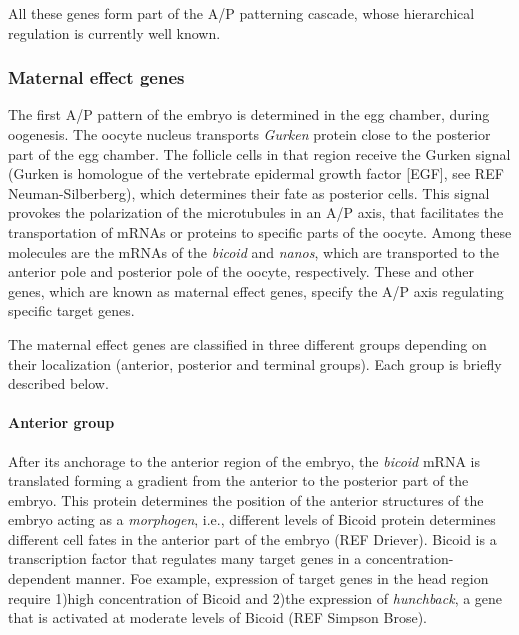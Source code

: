 All these genes form part of the A/P patterning cascade, whose hierarchical regulation is currently well known.

\subsubsection{Maternal effect genes}
The first A/P pattern of the embryo is determined in the egg chamber, during oogenesis.
The oocyte nucleus transports \textit{Gurken} protein close to the posterior part of the egg chamber. 
The follicle cells in that region receive the Gurken signal (Gurken is homologue of the vertebrate epidermal growth factor [EGF], see REF Neuman-Silberberg), which determines their fate as posterior cells.
This signal provokes the polarization of the microtubules in an A/P axis, that facilitates the transportation of mRNAs or proteins to specific parts of the oocyte.
Among these molecules are the mRNAs of the \textit{bicoid} and \textit{nanos}, which are transported to the anterior pole and posterior pole of the oocyte, respectively.
These and other genes, which are known as maternal effect genes, specify the A/P axis regulating specific target genes.

The maternal effect genes are classified in three different groups depending on their localization (anterior, posterior and terminal groups). Each group is briefly described below.

\paragraph{Anterior group}
After its anchorage to the anterior region of the embryo, the \textit{bicoid} mRNA is translated forming a gradient from the anterior to the posterior part of the embryo.
This protein determines the position of the anterior structures of the embryo acting as a \textit{morphogen}, i.e., different levels of Bicoid protein determines different cell fates in the anterior part of the embryo (REF Driever).
Bicoid is a transcription factor that regulates many target genes in a concentration-dependent manner. Foe example, expression of target genes in the head region require 1)high concentration of Bicoid and 2)the expression of \textit{hunchback}, a gene that is activated at moderate levels of Bicoid (REF Simpson Brose).  

